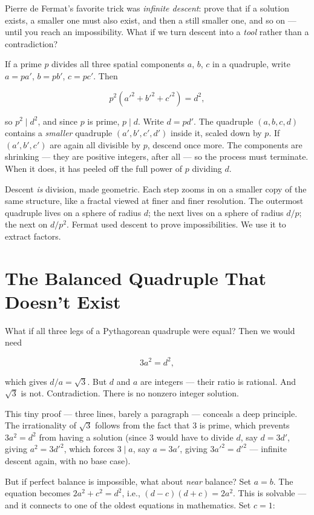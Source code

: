 \documentclass[11pt,twoside,openright]{book}
\theoremstyle{definition}
\theoremstyle{remark}
\begin{document}
Pierre de Fermat's favorite trick was \textit{infinite descent}: prove that if a solution exists, a smaller one must also exist, and then a still smaller one, and so on --- until you reach an impossibility. What if we turn descent into a \textit{tool} rather than a contradiction?

If a prime $p$ divides all three spatial components $a$, $b$, $c$ in a quadruple, write $a = pa'$, $b = pb'$, $c = pc'$. Then

\[p^2(a'^2 + b'^2 + c'^2) = d^2,\]

so $p^2 \mid d^2$, and since $p$ is prime, $p \mid d$. Write $d = pd'$. The quadruple $(a, b, c, d)$ contains a \textit{smaller} quadruple $(a', b', c', d')$ inside it, scaled down by $p$. If $(a', b', c')$ are again all divisible by $p$, descend once more. The components are shrinking --- they are positive integers, after all --- so the process must terminate. When it does, it has peeled off the full power of $p$ dividing $d$.

Descent \textit{is} division, made geometric. Each step zooms in on a smaller copy of the same structure, like a fractal viewed at finer and finer resolution. The outermost quadruple lives on a sphere of radius $d$; the next lives on a sphere of radius $d/p$; the next on $d/p^2$. Fermat used descent to prove impossibilities. We use it to extract factors.



\section{The Balanced Quadruple That Doesn't Exist}

What if all three legs of a Pythagorean quadruple were equal? Then we would need

\[3a^2 = d^2,\]

which gives $d/a = \sqrt{3}$. But $d$ and $a$ are integers --- their ratio is rational. And $\sqrt{3}$ is not. Contradiction. There is no nonzero integer solution.

This tiny proof --- three lines, barely a paragraph --- conceals a deep principle. The irrationality of $\sqrt{3}$ follows from the fact that $3$ is prime, which prevents $3a^2 = d^2$ from having a solution (since $3$ would have to divide $d$, say $d = 3d'$, giving $a^2 = 3d'^2$, which forces $3 \mid a$, say $a = 3a'$, giving $3a'^2 = d'^2$ --- infinite descent again, with no base case).

But if perfect balance is impossible, what about \textit{near} balance? Set $a = b$. The equation becomes $2a^2 + c^2 = d^2$, i.e., $(d - c)(d + c) = 2a^2$. This is solvable --- and it connects to one of the oldest equations in mathematics. Set $c = 1$:
\end{document}
